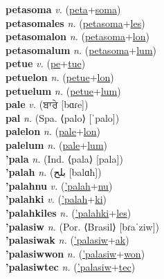 \textbf{petasoma} \textit{v.} (\hyperref[peta]{peta}+\hyperref[soma]{soma})
 \label{petasoma} \\
\textbf{petasomales} \textit{n.} (\hyperref[petasoma]{petasoma}+\hyperref[les]{les})
 \label{petasomales} \\
\textbf{petasomalon} \textit{n.} (\hyperref[petasoma]{petasoma}+\hyperref[lon]{lon})
 \label{petasomalon} \\
\textbf{petasomalum} \textit{n.} (\hyperref[petasoma]{petasoma}+\hyperref[lum]{lum})
 \label{petasomalum} \\
\textbf{petue} \textit{v.} (\hyperref[pe]{pe}+\hyperref[tue]{tue})
 \label{petue} \\
\textbf{petuelon} \textit{n.} (\hyperref[petue]{petue}+\hyperref[lon]{lon})
 \label{petuelon} \\
\textbf{petuelum} \textit{n.} (\hyperref[petue]{petue}+\hyperref[lum]{lum})
 \label{petuelum} \\
\textbf{pale} \textit{v.} ({\gurmukhi{}ਬਾਰੇ} [bɑɾe])
 \label{pale} \\
\textbf{pal} \textit{n.} (Spa. ⟨palo⟩ [ˈpalo])
 \label{pal} \\
\textbf{palelon} \textit{n.} (\hyperref[pale]{pale}+\hyperref[lon]{lon})
 \label{palelon} \\
\textbf{palelum} \textit{n.} (\hyperref[pale]{pale}+\hyperref[lum]{lum})
 \label{palelum} \\
\textbf{'pala} \textit{n.} (Ind. ⟨pala⟩ [pala])
 \label{'pala} \\
\textbf{'palah} \textit{n.} ({\arabics{}بلح} [balɑħ])
 \label{'palah} \\
\textbf{'palahnu} \textit{v.} (\hyperref['palah]{'palah}+\hyperref[nu]{nu})
 \label{'palahnu} \\
\textbf{'palahki} \textit{v.} (\hyperref['palah]{'palah}+\hyperref[ki]{ki})
 \label{'palahki} \\
\textbf{'palahkiles} \textit{n.} (\hyperref['palahki]{'palahki}+\hyperref[les]{les})
 \label{'palahkiles} \\
\textbf{'palasiw} \textit{n.} (Por. ⟨Brasil⟩ [bɾaˈziw])
 \label{'palasiw} \\
\textbf{'palasiwak} \textit{n.} (\hyperref['palasiw]{'palasiw}+\hyperref[ak]{ak})
 \label{'palasiwak} \\
\textbf{'palasiwwon} \textit{n.} (\hyperref['palasiw]{'palasiw}+\hyperref[won]{won})
 \label{'palasiwwon} \\
\textbf{'palasiwtec} \textit{n.} (\hyperref['palasiw]{'palasiw}+\hyperref[tec]{tec})
